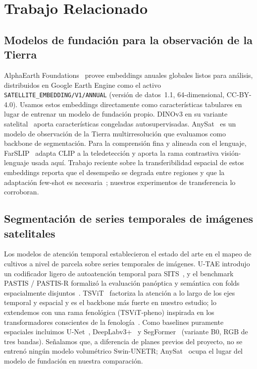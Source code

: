 \section{Trabajo Relacionado}
\label{sec:related}

\subsection{Modelos de fundación para la observación de la Tierra}
AlphaEarth Foundations~\cite{brown2025alphaearth} provee embeddings
anuales globales listos para análisis, distribuidos en Google Earth
Engine como el activo \texttt{SATELLITE\_EMBEDDING/V1/ANNUAL} (versión de
datos~1.1, 64-dimensional, CC-BY-4.0). Usamos estos embeddings
directamente como características tabulares en lugar de entrenar un
modelo de fundación propio. DINOv3 en su variante
satelital~\cite{oquab2023dinov3} aporta características congeladas
autosupervisadas. AnySat~\cite{astruc2024anysat} es un modelo de
observación de la Tierra multirresolución que evaluamos como backbone de
segmentación. Para la comprensión fina y alineada con el lenguaje,
FarSLIP~\cite{li2025farslip} adapta CLIP a la teledetección y aporta la
rama contrastiva visión-lenguaje usada aquí. Trabajo reciente sobre la
transferibilidad espacial de estos embeddings reporta que el desempeño
se degrada entre regiones y que la adaptación few-shot es
necesaria~\cite{harvesting2026alphaearth}; nuestros experimentos de
transferencia lo corroboran.

\subsection{Segmentación de series temporales de imágenes satelitales}
Los modelos de atención temporal establecieron el estado del arte en el
mapeo de cultivos a nivel de parcela sobre series temporales de
imágenes. U-TAE introdujo un codificador ligero de autoatención temporal
para SITS~\cite{garnot2021utae}, y el benchmark PASTIS / PASTIS-R
formalizó la evaluación panóptica y semántica con folds espacialmente
disjuntos~\cite{garnot2021pastis}. TSViT~\cite{tarasiou2023tsvit}
factoriza la atención a lo largo de los ejes temporal y espacial y es el
backbone más fuerte en nuestro estudio; lo extendemos con una rama
fenológica (TSViT-pheno) inspirada en los transformadores conscientes de
la fenología~\cite{wen2025phenology}. Como baselines puramente
espaciales incluimos U-Net~\cite{ronneberger2015unet},
DeepLabv3+~\cite{chen2018deeplabv3plus} y
SegFormer~\cite{xie2021segformer} (variante B0, RGB de tres bandas).
Señalamos que, a diferencia de planes previos del proyecto, no se
entrenó ningún modelo volumétrico Swin-UNETR;
AnySat~\cite{astruc2024anysat} ocupa el lugar del modelo de fundación en
nuestra comparación.

